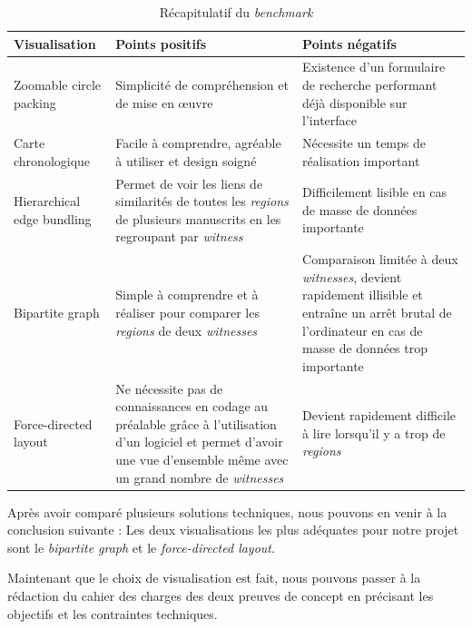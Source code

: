 \begin{table}[H]
	\centering 
\begin{tabular}{|p{3cm}|p{5cm}|p{5cm}|}
	\hline 
	Visualisation & Points positifs & Points négatifs \\ \hline
	Zoomable circle packing & Simplicité de compréhension et de mise en œuvre & Existence d'un formulaire de recherche performant déjà disponible sur l'interface\\ \hline 
	Carte chronologique & Facile à comprendre, agréable à utiliser et design soigné & Nécessite un temps de réalisation important \\ \hline 
	Hierarchical edge bundling & Permet de voir les liens de similarités de toutes les \textit{regions} de plusieurs manuscrits en les regroupant par \textit{witness} & Difficilement lisible en cas de masse de données importante \\ \hline 
	Bipartite graph & Simple à comprendre et à réaliser pour comparer les \textit{regions} de deux \textit{witnesses} & Comparaison limitée à deux \textit{witnesses}, devient rapidement illisible et entraîne un arrêt brutal de l'ordinateur en cas de masse de données trop importante \\ \hline 
	Force-directed layout & 
	Ne nécessite pas de connaissances en codage au préalable grâce à l'utilisation d'un logiciel et permet d'avoir une vue d'ensemble même avec un grand nombre de \textit{witnesses} & Devient rapidement difficile à lire lorsqu'il y a trop de \textit{regions}  \\ \hline 
	\hline
\end{tabular}
\caption{Récapitulatif du \textit{benchmark}}
\label{fig:benchmark_evaluation}
\end{table}

Après avoir comparé plusieurs solutions techniques, nous pouvons en venir à la conclusion suivante : Les deux visualisations les plus adéquates pour notre projet sont le \textit{bipartite graph} et le \textit{force-directed layout}.

Maintenant que le choix de visualisation est fait, nous pouvons passer à la rédaction du cahier des charges des deux preuves de concept en précisant les objectifs et les contraintes techniques.
